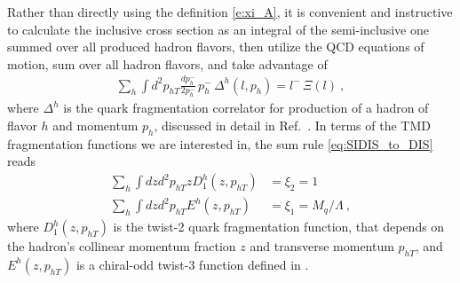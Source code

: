 \documentclass[preprintnumbers,floatfix,nofootinbib]{revtex4}
\newcommand{\mj}{M_q}
\begin{document}
Rather than directly using the definition \eqref{e:xi_A}, it is convenient and instructive to calculate the inclusive cross section as an integral of the semi-inclusive one summed over all produced hadron flavors, then utilize the QCD equations of motion, sum over all hadron flavors, and take advantage of  
\begin{align}
  \label{eq:SIDIS_to_DIS}
  \sum_h \int d^2p_{hT}\frac{dp_h^-}{2p_h^-} \,p_h^- \, \Delta^h(l,p_h) = l^-\,\Xi(l) \ , 
\end{align}
where $\Delta^h$ is the quark fragmentation correlator for production of a
hadron of flavor $h$ and momentum $p_h$, discussed in detail in Ref.~\cite{Bacchetta:2006tn}. In terms of
the TMD fragmentation functions we are interested in, the sum rule \eqref{eq:SIDIS_to_DIS} reads 
\begin{align}
  \label{eq:SIDIS_to_DIS_TMDlevel1}
  \sum_h \int dz d^2p_{hT} z D_1^h(z,p_{hT}) & = \xi_2 = 1   \\
  \label{eq:SIDIS_to_DIS_TMDlevel2}
  \sum_h \int dz d^2p_{hT} E^h(z,p_{hT}) & = \xi_1 = \mj / \Lambda\ ,
\end{align}
where $D_1^h(z,p_{hT})$ is the twist-2 quark fragmentation function, that depends on the hadron's collinear momentum fraction $z$ and transverse
momentum $p_{hT}$, and $E^h(z,p_{hT})$ is a chiral-odd twist-3 function
defined in \cite{Bacchetta:2006tn}. 
\end{document}
